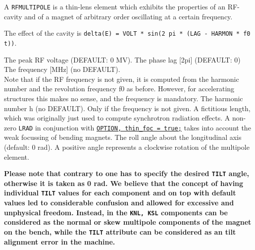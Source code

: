 
A {\tt RFMULTIPOLE} is a thin-lens element which exhibits the properties
of an RF-cavity and of a magnet of arbitrary order oscillating at
a certain frequency.

The effect of the cavity is {\tt delta(E) = VOLT * sin(2 pi * (LAG - HARMON *
f0 t))}. 
 
\begin{madlist}
    The peak RF voltage (DEFAULT: 0 MV).  
    The phase lag [2pi] (DEFAULT: 0) 
    The frequency [MHz] (no DEFAULT). \\ 
     Note that if the RF
     frequency is not given, it is computed from the harmonic
     number and the revolution frequency f0 as before. However, for
     accelerating structures this makes no sense, and the frequency
     is mandatory.  
    The harmonic number h (no DEFAULT). Only if the
     frequency is not given. 
    A fictitious length, which was originally just used to
     compute synchrotron radiation effects. A non-zero {\tt LRAD} in
     conjunction with \hyperref[sec:option]{\tt OPTION, thin\_foc = true;} 
     takes into account the weak focussing of bending magnets.  
    The roll angle about the longitudinal axis (default: 0
     rad). A positive angle represents a clockwise rotation of the
     multipole element.            

     \textbf{Please note that contrary to \madeight one has to specify the
       desired {\tt TILT} angle, otherwise it is taken as 0 rad. We
       believe that the \madeight concept of having individual {\tt TILT}
       values for each component and on top with default values
       led to considerable confusion and allowed for excessive
       and unphysical freedom. Instead, in \madx the {\tt KNL, KSL}
       components can be considered as the normal or skew
       multipole components of the magnet on the bench, while the
       {\tt TILT} attribute can be considered as an tilt alignment
       error in the machine.} 


\end{madlist}
